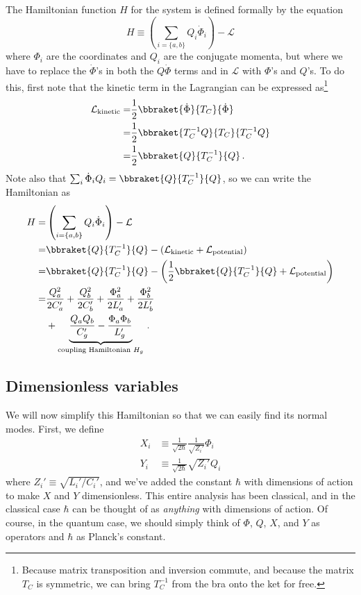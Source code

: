 \documentclass{article}
\begin{document}
The Hamiltonian function $H$ for the system is defined formally by the equation
\begin{equation*}
  H \equiv \left( \sum_{i = \{a, b\}} Q_i \dot \Phi_i \right) - \mathcal{L}
\end{equation*}
where $\Phi_i$ are the coordinates and $Q_i$ are the conjugate momenta, but where we have to replace the $\dot \Phi$'s in both the $Q \dot \Phi$ terms and in $\mathcal{L}$ with $\Phi$'s and $Q$'s.
To do this, first note that the kinetic term in the Lagrangian can be expressed as\footnote{Because matrix transposition and inversion commute, and because the matrix $T_C$ is symmetric, we can bring $T_C^{-1}$ from the bra onto the ket for free.}
\begin{align*}
  \mathcal{L}_\text{kinetic}
  =& \frac{1}{2} \bbraket{\dot \Phi}{T_C}{\dot \Phi} \\
  =& \frac{1}{2} \bbraket{T_C^{-1} Q}{T_C}{T_C^{-1} Q} \\
  =& \frac{1}{2} \bbraket{Q}{T_C^{-1}}{Q}
  \, .
\end{align*}
Note also that $\sum_i \dot \Phi_i Q_i = \bbraket{Q}{T_C^{-1}}{Q}$, so we can write the Hamiltonian as
\begin{align}
  H
  =& \left( \sum_{i = \{a, b\}} Q_i \dot \Phi_i \right) - \mathcal{L} \nonumber \\
  =& \bbraket{Q}{T_C^{-1}}{Q} - \left( \mathcal{L}_\text{kinetic} + \mathcal{L}_\text{potential} \right) \nonumber \\
  =& \bbraket{Q}{T_C^{-1}}{Q} - \left( \frac{1}{2} \bbraket{Q}{T_C^{-1}}{Q} + \mathcal{L}_\text{potential} \right) \nonumber \\
  =& \frac{Q_a^2}{2 C_a'} + \frac{Q_b^2}{2 C_b'} + \frac{\Phi_a^2}{2 L_a'} + \frac{\Phi_b^2}{2 L_b'} \nonumber \\
  &+ \underbrace{\frac{Q_a Q_b}{C_g'} - \frac{\Phi_a \Phi_b}{L_g'}}_{\text{coupling Hamiltonian }H_g}
  \, .
\end{align}

\subsection{Dimensionless variables}

We will now simplify this Hamiltonian so that we can easily find its normal modes.
First, we define
\begin{align*}
  X_i &\equiv \frac{1}{\sqrt{2 \hbar}} \frac{1}{\sqrt{Z_i'}} \Phi_i \\
  Y_i &\equiv \frac{1}{\sqrt{2 \hbar}} \sqrt{Z_i'} Q_i
\end{align*}
where $Z_i' \equiv \sqrt{L_i' / C_i'}$, and we've added the constant $\hbar$ with dimensions of action to make $X$ and $Y$ dimensionless.
This entire analysis has been classical, and in the classical case $\hbar$ can be thought of as \emph{anything} with dimensions of action.
Of course, in the quantum case, we should simply think of $\Phi$, $Q$, $X$, and $Y$ as operators and $\hbar$ as Planck's constant.
\end{document}
